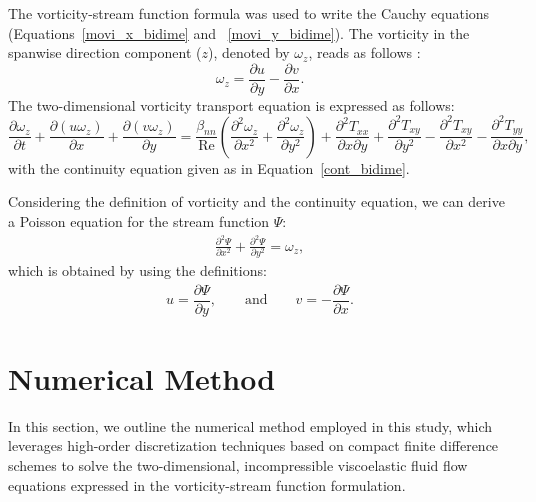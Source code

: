 \documentclass[preprint, 12pt]{elsarticle}
\begin{document}
The vorticity-stream function formula was used to write the Cauchy equations (Equations~\eqref{movi_x_bidime} and ~\eqref{movi_y_bidime}). The vorticity in the spanwise direction component ($z$), denoted by $\omega_{z}$, reads as follows \cite{roache72}:
\begin{equation}
    \omega_{z} = \dfrac{\partial u}{\partial y} - \dfrac{\partial v}{\partial x}.
\end{equation}
The two-dimensional vorticity transport equation is expressed as follows:
\begin{equation}
    \dfrac{\partial \omega_{z}}{\partial t}+\dfrac{\partial(u\omega_{z})}{\partial x}+\dfrac{\partial(v\omega_{z})}{\partial y} = \dfrac{\beta_{nn}}{\operatorname{Re}}\left( \dfrac{\partial^{2}\omega_{z}}{\partial x^{2}} + \dfrac{\partial^{2}\omega_{z}}{\partial y^{2}} \right)+\dfrac{\partial^{2}T_{xx}}{\partial x\partial y}+\dfrac{\partial^{2}T_{xy}}{\partial y^{2}}-\dfrac{\partial^{2}T_{xy}}{\partial x^{2}}-\dfrac{\partial^{2}T_{yy}}{\partial x\partial y},
\label{eq_vorticity_wz}
\end{equation}
with the continuity equation given as in Equation~\eqref{cont_bidime}.

Considering the definition of vorticity and the continuity equation, we can derive a Poisson equation for the stream function $\Psi$:
\begin{align}
    \frac{\partial^2 \Psi}{\partial x^2}+\frac{\partial^2 \Psi}{\partial y^2}= \omega_z,\label{eq_psi_vortic_corrent}
\end{align}
which is obtained by using the definitions:
\begin{align}
    u = \dfrac{\partial \Psi}{\partial y}, \qquad \textrm{and} \qquad v = - \dfrac{\partial \Psi}{\partial x}.\label{Psiy_u_Psix_v}
\end{align}

\section{Numerical Method}\label{sec_NumericalMethod}

In this section, we outline the numerical method employed in this study, which leverages high-order discretization techniques based on compact finite difference schemes to solve the two-dimensional, incompressible viscoelastic fluid flow equations expressed in the vorticity-stream function formulation.
\end{document}
